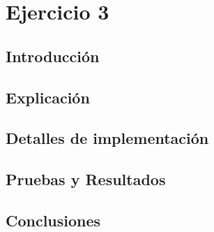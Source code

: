 \section{Ejercicio 3}
\subsection{Introducción}


\subsection{Explicación}


\subsection{Detalles de implementación}


\subsection{Pruebas y Resultados}


\subsection{Conclusiones}


